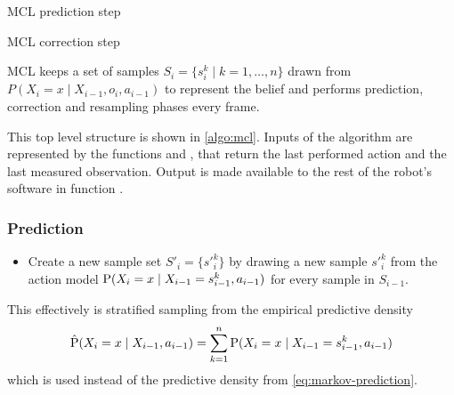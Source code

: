 \begin{algorithm}[tp]
	\caption{MCL prediction step}
	\label{algo:mcl-predict}
\end{algorithm}


\begin{algorithm}[tp]
	\caption{MCL correction step}
	\label{algo:mcl-correct}
\end{algorithm}

MCL keeps a set of samples \(S_i = \{s^k_{i} \mid k = 1,\dotsc,n\} \) drawn from
\(P(X_i = x \mid X_{i-1}, o_i, a_{i - 1})\) to represent the belief and performs
prediction, correction and resampling phases every frame.

This top level structure is shown in \autoref{algo:mcl}.
Inputs of the algorithm are represented by the functions
\getAction{} and \getObservation{}, that return the last performed action and the
last measured observation.
Output is made available to the rest of the robot's software in function \outputPosition{}.

\subsubsection{Prediction}
	\begin{itemize}
	\item
	Create a new sample set \(S'_i = \{s'^k_{i}\} \)
	by drawing a new sample \(s'^k_{i}\)
	from the action model \(\operatorname{\mathrm{P}}(X_i = x \mid X_{i-1} = s^k_{i-1}, a_{i - 1})\)
	for every sample in \(S_{i-1}\).
	\end{itemize}

	This effectively is stratified sampling from the empirical predictive density
	\begin{equation}
		\label{eq:mcl-predictive-density}
		\hat{\operatorname{\mathrm{P}}}(X_i = x \mid X_{i - 1}, a_{i - 1}) =
		\sum_{k = 1}^n \operatorname{\mathrm{P}}(X_i = x \mid X_{i-1} = s^k_{i-1}, a_{i - 1})
	\end{equation}
	which is used instead of the predictive density from \eqref{eq:markov-prediction}.

